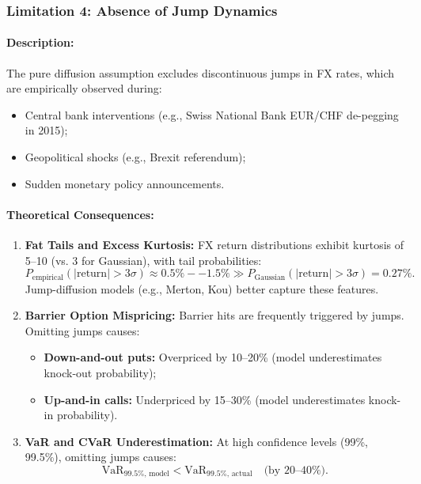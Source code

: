 \subsubsection{Limitation 4: Absence of Jump Dynamics}

\paragraph{Description:}
The pure diffusion assumption excludes discontinuous jumps in FX rates, which are empirically observed during:
\begin{itemize}
	\item Central bank interventions (e.g., Swiss National Bank EUR/CHF de-pegging in 2015);
	\item Geopolitical shocks (e.g., Brexit referendum);
	\item Sudden monetary policy announcements.
\end{itemize}

\paragraph{Theoretical Consequences:}
\begin{enumerate}
	\item \textbf{Fat Tails and Excess Kurtosis:} FX return distributions exhibit kurtosis of 5--10 (vs. 3 for Gaussian), with tail probabilities:
	\begin{equation}
		P_{\text{empirical}}(|\text{return}| > 3\sigma) \approx 0.5\%--1.5\% \gg P_{\text{Gaussian}}(|\text{return}| > 3\sigma) = 0.27\%.
	\end{equation}
	Jump-diffusion models (e.g., Merton, Kou) better capture these features.
	
	\item \textbf{Barrier Option Mispricing:} Barrier hits are frequently triggered by jumps. Omitting jumps causes:
	\begin{itemize}
		\item \textbf{Down-and-out puts:} Overpriced by 10--20\% (model underestimates knock-out probability);
		\item \textbf{Up-and-in calls:} Underpriced by 15--30\% (model underestimates knock-in probability).
	\end{itemize}
	
	\item \textbf{VaR and CVaR Underestimation:} At high confidence levels (99\%, 99.5\%), omitting jumps causes:
	\begin{equation}
		\text{VaR}_{99.5\%,\,\text{model}} < \text{VaR}_{99.5\%,\,\text{actual}} \quad \text{(by 20--40\%)}.
	\end{equation}
\end{enumerate}

